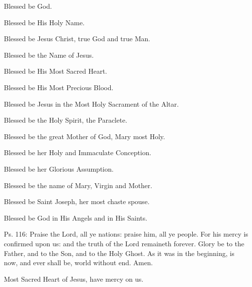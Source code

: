 \documentclass[11pt]{article}
\begin{document}
\begin{multicols}{2}
\raggedcolumns
\begin{otherlanguage}{english}

Blessed be God. 

Blessed be His Holy Name. 

Blessed be Jesus Christ, true God and true Man.
 
Blessed be the Name of Jesus.

Blessed be His Most Sacred Heart.

Blessed be His Most Precious Blood.

Blessed be Jesus in the Most Holy Sacrament of the Altar.

Blessed be the Holy Spirit, the Paraclete.

Blessed be the great Mother of God, Mary most Holy.

Blessed be her Holy and Immaculate Conception.


Blessed be her Glorious Assumption.

Blessed be the name of Mary, Virgin and Mother.

Blessed be Saint Joseph, her most chaste spouse.

Blessed be God in His Angels and in His Saints.

\end{otherlanguage}
\end{multicols}






\begin{otherlanguage}{english}\noindent Ps. 116: Praise the Lord, all ye nations: praise him, all ye people. For his mercy is confirmed upon us: and the truth of the Lord remaineth forever. Glory be to the Father, and to the Son, and to the Holy Ghost. As it was in the beginning, is now, and ever shall be, world without end. Amen.\end{otherlanguage}



\begin{otherlanguage}{english}\end{otherlanguage}


\begin{otherlanguage}{english}Most Sacred Heart of Jesus, have mercy on us.
\end{otherlanguage}
\end{document}
